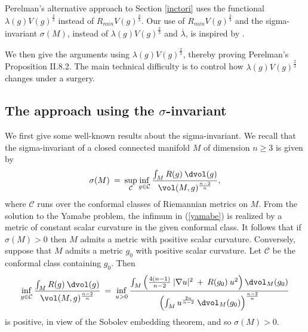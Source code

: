 Perelman's alternative approach to
Section \ref{inctori} uses the functional $\lambda(g) V(g)^{\frac23}$
instead of $R_{min} V(g)^{\frac23}$. Our use of $R_{min} V(g)^{\frac23}$ and
the sigma-invariant
$\sigma(M)$, instead of $\lambda(g) V(g)^{\frac23}$ and $\overline{\lambda}$,
is inspired by \cite{Anderson2}.

We then give the arguments using $\lambda(g) V(g)^{\frac23}$,
thereby proving Perelman's Proposition II.8.2.
The main technical difficulty is to
control how $\lambda(g) V(g)^{\frac23}$ changes under a surgery.

\subsection{The approach using the $\sigma$-invariant}

We first give some well-known results about the sigma-invariant.
We recall that the sigma-invariant of a closed connected
manifold $M$ of dimension $n \ge 3$ is given by
\begin{equation} \label{yamabe}
\sigma(M) \: = \: \sup_{{\mathcal C}} \inf_{g \in {\mathcal C}}
\frac{\int_M R(g) \: \dvol(g)}{\vol(M, g)^{\frac{n-2}{n}}},
\end{equation}
where ${\mathcal C}$ runs over the conformal classes of Riemannian
metrics on $M$.
From the solution to the Yamabe problem,
the infimum in (\ref{yamabe}) is realized by a metric of constant
scalar curvature in the given conformal class.
It follows that if $\sigma(M) > 0$ then $M$ admits a metric with
positive scalar curvature. Conversely, suppose that $M$ admits
a metric $g_0$ with positive scalar curvature. Let ${\mathcal C}$
be the conformal class containing $g_0$.  Then
\begin{equation}
\inf_{g \in {\mathcal C}}
\frac{\int_M R(g) \: \dvol(g)}{\vol(M, g)^{\frac{n-2}{n}}} \: = \:
\inf_{u > 0} \frac{
\int_M \left(
\frac{4(n-1)}{n-2} \:  |\nabla u|^2 \: + \:
R(g_0) \: u^2 \right) \dvol_M(g_0)
}{
\left( \int_M u^{\frac{2n}{n-2}} \: \dvol_M(g_0) \right)^{\frac{n-2}{n}}}
\end{equation}
is positive, in view of the Sobolev embedding theorem, and so $\sigma(M) > 0$.

